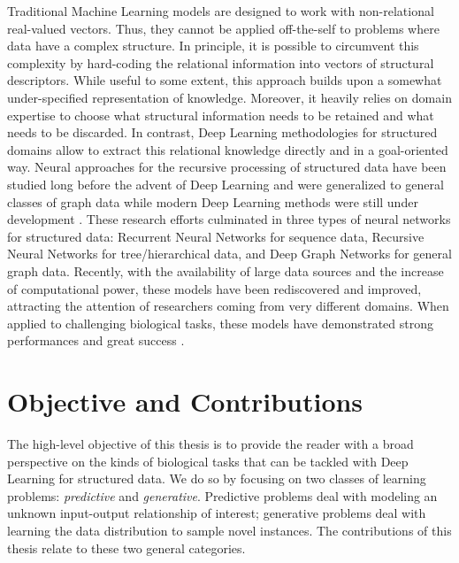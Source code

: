 Traditional Machine Learning models are designed to work with non-relational real-valued vectors. Thus, they cannot be applied off-the-self to problems where data have a complex structure. In principle, it is possible to circumvent this complexity by hard-coding the relational information into vectors of structural descriptors. While useful to some extent, this approach builds upon a somewhat under-specified representation of knowledge. Moreover, it heavily relies on domain expertise to choose what structural information needs to be retained and what needs to be discarded. In contrast, Deep Learning methodologies for structured domains allow to extract this relational knowledge directly and in a goal-oriented way. Neural approaches for the recursive processing of structured data have been studied long before the advent of Deep Learning \cite{elman1990rnn,hochreiter1997lstm,sperduti1997generalizedneuron,frasconi1998general} and were generalized to general classes of graph data while modern Deep Learning methods were still under development \citep{micheli2009nn4g,scarselli2009gnn}. These research efforts culminated in three types of neural networks for structured data: Recurrent Neural Networks for sequence data, Recursive Neural Networks for tree/hierarchical data, and Deep Graph Networks for general graph data. Recently, with the availability of large data sources and the increase of computational power, these models have been rediscovered and improved, attracting the attention of researchers coming from very different domains. When applied to challenging biological tasks, these models have demonstrated strong performances and great success
\cite{bianucci2000applicationcascorstructurechemistry,baldi2013recursiveneuralnets,duvenaud2015molecularfingerprint,bradshaw2019moleculechef}.

\section{Objective and Contributions}
The high-level objective of this thesis is to provide the reader with a broad perspective on the kinds of biological tasks that can be tackled with Deep Learning for structured data. We do so by focusing on two classes of learning problems: \emph{predictive} and \emph{generative}. Predictive problems deal with modeling an unknown input-output relationship of interest; generative problems deal with learning the data distribution to sample novel instances. The contributions of this thesis relate to these two general categories.

